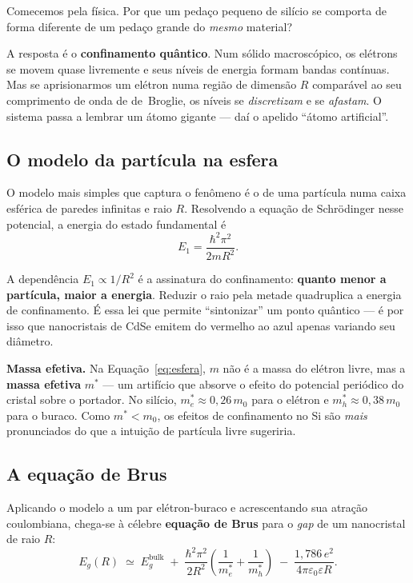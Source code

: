 \documentclass[11pt,a4paper,openany]{book}
\begin{document}
Comecemos pela física. Por que um pedaço pequeno de silício se comporta de forma
diferente de um pedaço grande do \emph{mesmo} material?

A resposta é o \textbf{confinamento quântico}. Num sólido macroscópico, os elétrons
se movem quase livremente e seus níveis de energia formam bandas contínuas. Mas
se aprisionarmos um elétron numa região de dimensão $R$ comparável ao seu
comprimento de onda de de~Broglie, os níveis se \emph{discretizam} e se
\emph{afastam}. O sistema passa a lembrar um átomo gigante --- daí o apelido
``átomo artificial''.

\subsection{O modelo da partícula na esfera}

O modelo mais simples que captura o fenômeno é o de uma partícula numa caixa
esférica de paredes infinitas e raio $R$. Resolvendo a equação de Schrödinger
nesse potencial, a energia do estado fundamental é
\begin{equation}
  E_1 = \frac{\hbar^2 \pi^2}{2 m R^2}.
  \label{eq:esfera}
\end{equation}

\noindent
A dependência $E_1 \propto 1/R^2$ é a assinatura do confinamento: \textbf{quanto
menor a partícula, maior a energia}. Reduzir o raio pela metade quadruplica a
energia de confinamento. É essa lei que permite ``sintonizar'' um ponto quântico
--- é por isso que nanocristais de CdSe emitem do vermelho ao azul apenas variando
seu diâmetro.

\begin{caixanota}
\textbf{Massa efetiva.} Na Equação~\ref{eq:esfera}, $m$ não é a massa do elétron
livre, mas a \textbf{massa efetiva} $m^*$ --- um artifício que absorve o efeito do
potencial periódico do cristal sobre o portador. No silício, $m^*_e \approx
0{,}26\,m_0$ para o elétron e $m^*_h \approx 0{,}38\,m_0$ para o buraco. Como $m^*
< m_0$, os efeitos de confinamento no Si são \emph{mais} pronunciados do que a
intuição de partícula livre sugeriria.
\end{caixanota}

\subsection{A equação de Brus}

Aplicando o modelo a um par elétron-buraco e acrescentando sua atração
coulombiana, chega-se à célebre \textbf{equação de Brus} para o \emph{gap} de um
nanocristal de raio $R$:
\begin{equation}
  E_g(R) \;\simeq\; E_g^{\text{bulk}}
  \;+\; \frac{\hbar^2\pi^2}{2R^2}\left(\frac{1}{m^*_e}+\frac{1}{m^*_h}\right)
  \;-\; \frac{1{,}786\,e^2}{4\pi\varepsilon_0 \varepsilon R}.
  \label{eq:brus}
\end{equation}
\end{document}

